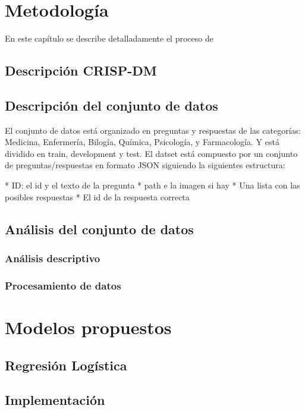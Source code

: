 \chapter{Metodología}\label{chapter:methods}

En este capítulo se describe detalladamente el proceso de


\section{Descripción CRISP-DM}

\section{Descripción del conjunto de datos}

El conjunto de datos está organizado en preguntas y respuestas de las categorías: Medicina, Enfermería, Bilogía, Química, Psicología, y Farmacología. Y está dividido en train, development y test. El datset está compuesto por un conjunto de preguntas/respuestas en formato JSON siguiendo la siguientes estructura:

* ID: el id y el texto de la pregunta
* path e la imagen si hay
* Una lista con las posibles respuestas
* El id de la respuesta correcta


\section{Análisis del conjunto de datos}

\subsection{Análisis descriptivo}

\subsection{Procesamiento de datos}


\chapter{Modelos propuestos}\label{chapter:models}

\section{Regresión Logística}


\section{Implementación}




